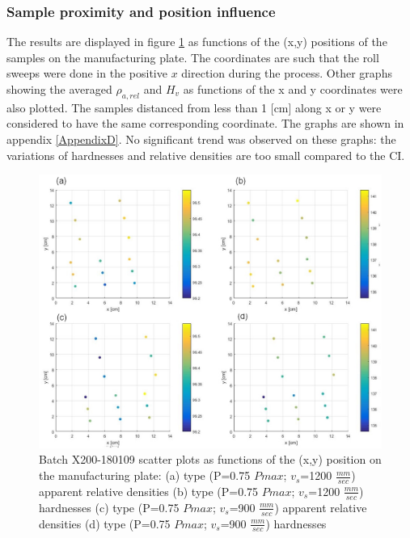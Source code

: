 \subsubsection{Sample proximity and position influence}
The results are displayed in figure \ref{fig:180109-HD} as functions of the (x,y) positions of the samples on the manufacturing plate. The coordinates are such that the roll sweeps were done in the positive $x$ direction during the process. Other graphs showing the averaged $\rho_{a,rel}$ and $H_v$ as functions of the x and y coordinates were also plotted. The samples distanced from less than 1 [cm] along x or y were considered to have the same corresponding coordinate. The graphs are shown in appendix \ref{AppendixD}. No significant trend was observed on these graphs: the variations of hardnesses and relative densities are too small compared to the CI. \\
\begin{figure}[h!]
\centering
\centerline{\includegraphics[scale=0.62]{Images/180109-HD}}
\decoRule
\caption[Batch X200-180109 scatter plots as functions of the (x,y) position on the manufacturing plate: (a) type (P=0.75 $Pmax$; $v_s$=1200 $\frac{mm}{sec}$) apparent relative densities (b) type (P=0.75 $Pmax$; $v_s$=1200 $\frac{mm}{sec}$) hardnesses (c) type (P=0.75 $Pmax$; $v_s$=900 $\frac{mm}{sec}$) apparent relative densities (d) type (P=0.75 $Pmax$; $v_s$=900 $\frac{mm}{sec}$) hardnesses]{Batch X200-180109 scatter plots as functions of the (x,y) position on the manufacturing plate: (a) type (P=0.75 $Pmax$; $v_s$=1200 $\frac{mm}{sec}$) apparent relative densities (b) type (P=0.75 $Pmax$; $v_s$=1200 $\frac{mm}{sec}$) hardnesses (c) type (P=0.75 $Pmax$; $v_s$=900 $\frac{mm}{sec}$) apparent relative densities (d) type (P=0.75 $Pmax$; $v_s$=900 $\frac{mm}{sec}$) hardnesses}
\label{fig:180109-HD}
\end{figure} 

